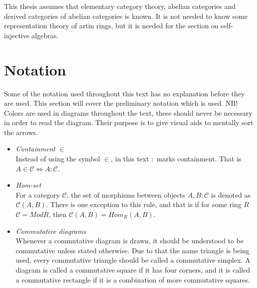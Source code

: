     This thesis assumes that elementary category theory, abelian categories and derived categories of abelian categories is known. It is not needed to know some representation theory of artin rings, but it is needed for the section on self-injective algebras.
        
\chapter*{Notation}
    Some of the notation used throughout this text has no explanation before they are used. This section will cover the preliminary notation which is used. NB! Colors are used in diagrams throughout the text, these should never be necessary in order to read the diagram. Their purpose is to give visual aids to mentally sort the arrows.
    \begin{itemize}
        \item \emph{Containment} $\in$ \\
        Instead of using the symbol $\in$, in this text $:$ marks containment. That is $A\in\mathcal{C} \iff A:\mathcal{C}$.
        \item \emph{Hom-set} \\
        For a category $\mathcal{C}$, the set of morphisms between objects $A,B:\mathcal{C}$ is denoted as $\mathcal{C}(A,B)$. There is one exception to this rule, and that is if for some ring $R$ $\mathcal{C}=ModR$, then $\mathcal{C}(A,B)=Hom_R(A,B)$.
        \item \emph{Commutative diagrams} \\
        Whenever a commutative diagram is drawn, it should be understood to be commutative unless stated otherwise. Due to that the name triangle is being used, every commutative triangle should be called a commutative simplex. A diagram is called a commutative square if it has four corners, and it is called a commutative rectangle if it is a combination of more commutative squares.
        \begin{center}
\end{center}
\end{itemize}
